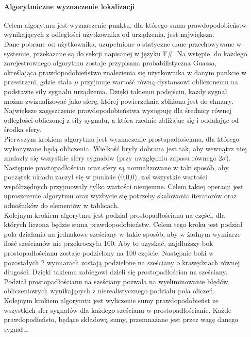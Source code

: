 \documentclass{article}
\begin{document}
		\paragraph{Algorytmiczne wyznaczenie lokalizacji}
		Celem algorytmu jest wyznaczenie punktu, dla którego suma prawdopodobieństw wynikających z odległości użytkownika od urządzenia, jest największa.\\
		Dane pobrane od użytkownika, uzupełnione o statyczne dane przechowywane w systemie, przekazane są do sekcji napisanej w języku F\#. Na wstępie, do każdego zarejestrownego algorytmu zostaje przypisana probabilistyczna Guassa, określająca prawdopodobieństwo znalezienia się użytkownika w danym punkcie w przestrzeni, gdzie stała $\mu$ przyjmuje wartość równą dystansowi obliczonemu na podstawie siły sygnału urządzenia. Dzięki takiemu podejściu, każdy sygnał można zwizualizować jako sferę, której powierzchnia zbliżona jest do chmury. Największe zagęszczenie prawdopodobieństwa występuję dla średnicy równej odległości obliczonej z siły sygnału, a która rzednie zbliżając się i oddalając od środka sfery.\\
		Pierwszym krokiem algorytmu jest wyznaczenie prostapadłościanu, dla którego wykonywane będą obliczenia. Wielkość bryły dobrana jest tak, aby wewnątrz niej znalazły się wszystkie sfery sygnałów (przy uwzględniu zapasu równego 2$\sigma$). Następnie prostopadłościan oraz sfery są normalizowane w taki sposób, aby początek układu zaczył się w punkcie (0,0,0), zaś wszystkie wartości współrzędnych przyjmowały tylko wartości nieujemne. Celem takiej operacji jest uproszczenie algorytmu oraz wyzbycie się potrzeby skalowania iteratorów oraz odnośników do elementów w tablicach.\\
		Kolejnym krokiem algorytmu jest podział prostopadłościanu na części, dla których liczona będzie suma prawdopodobieństw. Celem tego kroku jest podział pola działania na jednakowe sześciany w takie sposób, aby w żadnym wymiarze ilość sześcianów nie przekroczyła 100. Aby to uzyskać, najdłuższy bok prostopadłościanu zostaje podzielony na 100 częście. Następnie boki w pozostałych 2 wymiarach zostają podzielone na sześciany o krawędziach równej długości. Dzięki takiemu zabiegowi dzieli się prostopadłościan na sześciany. Podział prostopadłościanu na sześciany pozwala na wyeliminowanie błędów obliczeniowych wynikających z nierealistycznego podziału pola oliczeń.\\
		Kolejnym krokiem algorymtu jest wyliczenie sumy prawdopodobieńst ze wszystkich sfer sygnałów dla każdego sześcianu w prostopadłościanie. Każde prawdopodieństo, będące składową sumy, przemnażane jest przez wagę danego sygnału.		
\end{document}
